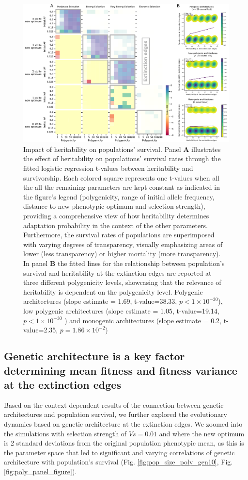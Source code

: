 \documentclass{article}
\begin{document}
\begin{figure}[h]
  \centering
  \includegraphics[width=1\textwidth]{figures/heristabilityvs_survivo_edges.pdf}
  \caption{Impact of heritability on populations' survival. Panel \textbf{A} illustrates the effect of heritability on populations' survival rates through the fitted logistic regression t-values between heritability and survivorship. Each colored square represents one t-values when all the all the remaining parameters are kept constant as indicated in the figure's legend (polygenicity, range of initial allele frequency, distance to new phenotypic optimum and selection strength), providing a comprehensive view of how heritability determines adaptation probability in the context of the other parameters. Furthermore, the survival rates of populations are superimposed with varying degrees of transparency, visually emphasizing areas of lower (less transparency) or higher mortality (more transparency). In panel \textbf{B} the fitted lines for the relationship between population's survival and heritability at the extinction edges are reported at three different polygenicity levels, showcasing that the relevance of heritability is dependent on the polygenicity level. Polygenic architectures (slope estimate = 1.69, t-value=38.33, $p<1 \times 10^{-30}$), low polygenic architectures (slope estimate = 1.05, t-value=19.14, $p<1 \times 10^{-30}$ ) and monogenic architectures (slope estimate = 0.2, t-value=2.35, $p=1.86 \times 10^{-2}$)}
  \label{fig:h2_panel_figure}
\end{figure}

\subsection{Genetic architecture is a key factor determining mean fitness and fitness variance at the extinction edges}
Based on the context-dependent results of the connection between genetic architectures and population survival, we further explored the evolutionary dynamics based on genetic architecture at the extinction edges. We zoomed into the simulations with selection strength of $Vs=0.01$ and where the new optimum is 2 standard deviations from the original population phenotypic mean, as this is the parameter space that led to significant and varying correlations of genetic architecture with population's survival (Fig. \ref{fig:pop_size_poly_gen10}, Fig. \ref{fig:poly_panel_figure}). 
\end{document}
